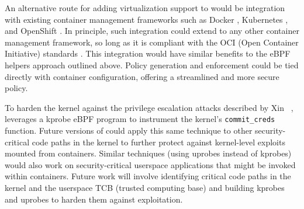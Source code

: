 An alternative route for adding virtualization support to \bpfcontain{} would be integration with existing container management frameworks such as Docker \cite{docker}, Kubernetes \cite{kubernetes}, and OpenShift \cite{openshift}. In principle, such integration could extend to any other container management framework, so long as it is compliant with the OCI (Open Container Initiative) standards \cite{oci}. This integration would have similar benefits to the eBPF helpers approach outlined above. Policy generation and enforcement could be tied directly with container configuration, offering a streamlined and more secure policy.

To harden the kernel against the privilege escalation attacks described by Xin \etal~\cite{xin2018_container_security}, \bpfcontain{} leverages a kprobe eBPF program to instrument the kernel's \texttt{commit\_creds} function. Future versions of \bpfcontain{} could apply this same technique to other security-critical code paths in the kernel to further protect against kernel-level exploits mounted from containers. Similar techniques (using uprobes instead of kprobes) would also work on security-critical userspace applications that might be invoked within containers. Future work will involve identifying critical code paths in the kernel and the userspace TCB (trusted computing base) and building \bpfcontain{} kprobes and uprobes to harden them against exploitation.
